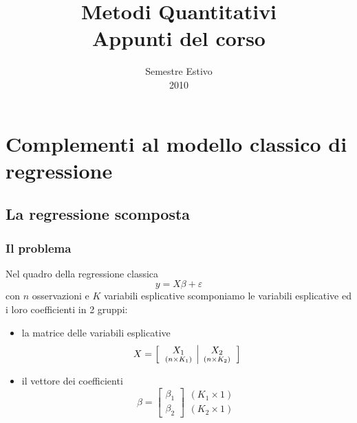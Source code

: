 \documentclass[a4paper]{report}
\theoremstyle{remark}
\begin{document}
\title{Metodi Quantitativi\\
Appunti del corso}
\author{}
\date{Semestre Estivo\\
2010}
\maketitle
\tableofcontents

\part{\protect\bigskip Complementi al modello classico di regressione}

\chapter{La regressione scomposta}

\section{Il problema}

Nel quadro della regressione classica%
\begin{equation*}
y=X\beta +\varepsilon
\end{equation*}%
con $n$ osservazioni e $K$ variabili esplicative scomponiamo le variabili
esplicative ed i loro coefficienti in 2 gruppi:

\begin{itemize}
\item la matrice delle variabili esplicative%
\begin{equation*}
X=\left[ 
\begin{tabular}{l|l}
$\underset{\left( n\times K_{1}\right) }{X_{1}}$ & $\underset{\left( n\times
K_{2}\right) }{X_{2}}$%
\end{tabular}%
\right]
\end{equation*}

\item il vettore dei coefficienti%
\begin{equation*}
\beta =\left[ 
\begin{array}{c}
\beta _{1} \\ 
\beta _{2}%
\end{array}%
\right] 
\begin{array}{c}
\left( K_{1}\times 1\right) \\ 
\left( K_{2}\times 1\right)%
\end{array}%
\end{equation*}
\end{itemize}
\end{document}
